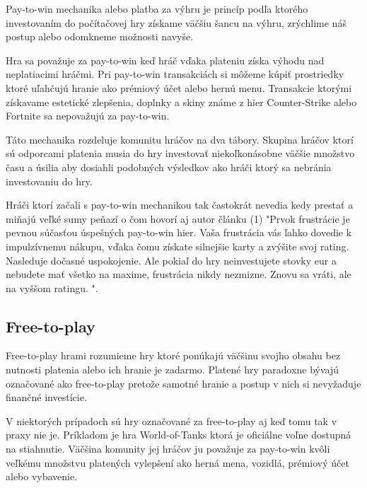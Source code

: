 \documentclass[10pt,twoside,slovak,a4paper]{article}
\begin{document}
Pay-to-win mechanika alebo platba za výhru je princíp podľa ktorého investovaním do počítačovej hry získame väčšiu šancu na výhru, zrýchlime náš postup alebo odomkneme možnosti navyše. 

Hra sa považuje za pay-to-win keď hráč vďaka plateniu získa výhodu nad neplatiacimi hráčmi. Pri pay-to-win transakciách si môžeme kúpiť prostriedky ktoré uľahčujú hranie ako prémiový účet alebo hernú menu. Transakcie ktorými získavame estetické zlepšenia, doplnky a skiny známe z hier Counter-Strike alebo Fortnite sa nepovažujú za pay-to-win.

Táto mechanika rozdeluje komunitu hráčov na dva tábory. Skupina hráčov ktorí sú odporcami platenia musia do hry investovať niekoľkonásobne väčšie množstvo času a úsilia aby dosiahli podobných výsledkov ako hráči ktorý sa nebránia investovaniu do hry. 

Hráči ktorí začali s pay-to-win mechanikou tak častokrát nevedia kedy prestať a miňajú veľké sumy peňazí o čom hovorí aj autor článku (1)
"Prvok frustrácie je pevnou súčasťou úspešných pay-to-win hier. Vaša frustrácia vás ľahko dovedie k impulzívnemu nákupu, vďaka čomu získate silnejšie karty a zvýšite svoj rating. Nasleduje dočasné uspokojenie. Ale pokiaľ do hry neinvestujete stovky eur a nebudete mať všetko na maxime, frustrácia nikdy nezmizne. Znovu sa vráti, ale na vyššom ratingu. "\cite{CL1}.





\subsection{Free-to-play} 

Free-to-play hrami rozumieme hry ktoré ponúkajú väčšinu svojho obsahu bez nutnosti platenia alebo ich hranie je zadarmo. Platené hry paradoxne bývajú označované ako free-to-play pretože samotné hranie a postup v nich si nevyžaduje finančné investície. 

V niektorých prípadoch sú hry označované za free-to-play aj keď tomu tak v praxy nie je. Príkladom je hra World-of-Tanks ktorá je oficiálne voľne dostupná na stiahnutie. Väčšina komunity jej hráčov ju považuje za pay-to-win kvôli veľkému množstvu platených vylepšení ako  herná mena, vozidlá, prémiový účet alebo vybavenie. 
\end{document}
